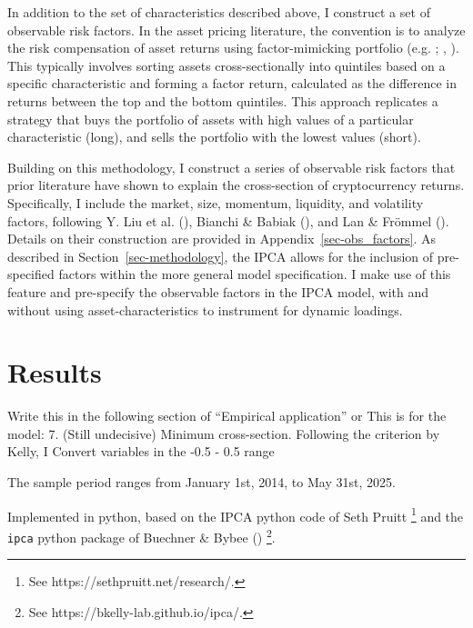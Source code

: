 \documentclass[
  12pt,
  a4paper,
  openany]{scrbook}
\begin{document}
In addition to the set of characteristics described above, I construct a
set of observable risk factors. In the asset pricing literature, the
convention is to analyze the risk compensation of asset returns using
factor-mimicking portfolio (e.g.
;
,
). This typically involves
sorting assets cross-sectionally into quintiles based on a specific
characteristic and forming a factor return, calculated as the difference
in returns between the top and the bottom quintiles. This approach
replicates a strategy that buys the portfolio of assets with high values
of a particular characteristic (long), and sells the portfolio with the
lowest values (short).

Building on this methodology, I construct a series of observable risk
factors that prior literature have shown to explain the cross-section of
cryptocurrency returns. Specifically, I include the market, size,
momentum, liquidity, and volatility factors, following Y. Liu et al.
(), Bianchi \& Babiak
(), and Lan \& Frömmel
(). Details on their construction
are provided in Appendix~\ref{sec-obs_factors}. As described in
Section~\ref{sec-methodology}, the IPCA allows for the inclusion of
pre-specified factors within the more general model specification. I
make use of this feature and pre-specify the observable factors in the
IPCA model, with and without using asset-characteristics to instrument
for dynamic loadings.


\chapter{Results}\label{results}

Write this in the following section of ``Empirical application'' or This
is for the model: 7. (Still undecisive) Minimum cross-section. Following
the criterion by Kelly, I Convert variables in the -0.5 - 0.5 range

The sample period ranges from January 1st, 2014, to May 31st, 2025.

Implemented in python, based on the IPCA python code of Seth Pruitt
\footnote{See https://sethpruitt.net/research/.} and the \texttt{ipca}
python package of Buechner \& Bybee ()
\footnote{See https://bkelly-lab.github.io/ipca/.}.
\end{document}
